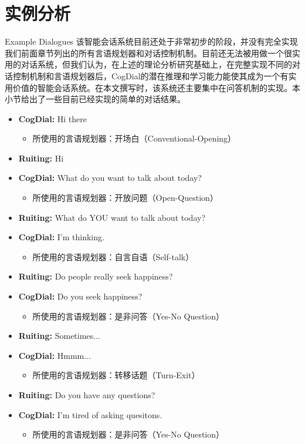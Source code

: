 \section{实例分析}{Example Dialogues}
该智能会话系统目前还处于非常初步的阶段，并没有完全实现我们前面章节列出的所有言语规划器和对话控制机制。目前还无法被用做一个很实用的对话系统，但我们认为，在上述的理论分析研究基础上，在完整实现不同的对话控制机制和言语规划器后，CogDial的潜在推理和学习能力能使其成为一个有实用价值的智能会话系统。在本文撰写时，该系统还主要集中在问答机制的实现。本小节给出了一些目前已经实现的简单的对话结果。
\begin{itemize}

\item {\bf CogDial:} Hi there
\begin{itemize}
\item 所使用的言语规划器：开场白（Conventional-Opening）
\end{itemize}

\item {\bf Ruiting:} Hi

\item {\bf CogDial:} What do you want to talk about today?
\begin{itemize}
\item 所使用的言语规划器：开放问题（Open-Question）
\end{itemize}

\item {\bf Ruiting:} What do YOU want to talk about today?

\item {\bf CogDial:} I'm thinking.
\begin{itemize}
\item 所使用的言语规划器：自言自语（Self-talk）
\end{itemize}

\item {\bf Ruiting:} Do people really seek happiness?

\item {\bf CogDial:} Do you seek happiness?
\begin{itemize}
\item 所使用的言语规划器：是非问答（Yes-No Question）
\end{itemize}

\item {\bf Ruiting:} Sometimes...

\item {\bf CogDial:} Hmmm...
\begin{itemize}
\item 所使用的言语规划器：转移话题（Turn-Exit）
\end{itemize}

\item {\bf Ruiting:} Do you have any questions?

\item {\bf CogDial:} I'm tired of asking quesitons.
\begin{itemize}
\item 所使用的言语规划器：是非问答（Yes-No Question）
\end{itemize}
\end{itemize}

